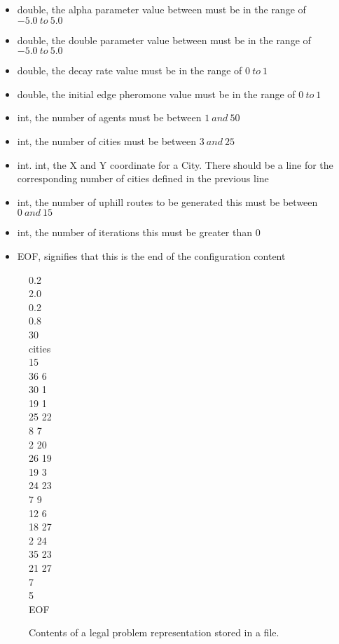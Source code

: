 \begin{itemize}
\item double, the alpha parameter value between must be in the range of $-5.0\ to\ 5.0$
\item double, the double parameter value between must be in the range of $-5.0\ to\ 5.0$
\item double, the decay rate value must be in the range of $0\ to\ 1$
\item double, the initial edge pheromone value must be in the range of $0\ to\ 1$
\item int, the number of agents must be between $1\ and\ 50$
\item int, the number of cities must be between $3\ and\ 25$
\item int. int, the X and Y coordinate for a City. There should be a line for the corresponding number of cities defined in the previous line
\item int, the number of uphill routes to be generated this must be between $0\ and\ 15$
\item int, the number of iterations this must be greater than $0$
\item EOF, signifies that this is the end of the configuration content
\end{itemize}

\begin{figure}[H]
0.2 \\
2.0 \\
0.2 \\
0.8 \\
30 \\
cities \\
15 \\
36 6 \\
30 1 \\
19 1 \\
25 22 \\
8 7 \\
2 20 \\
26 19 \\
19 3 \\
24 23 \\
7 9 \\
12 6 \\
18 27 \\
2 24 \\
35 23 \\
21 27 \\
7 \\
5 \\
EOF
\caption[Legal File Contents]{Contents of a legal problem representation stored in a file.}
\label{validConfig}
\end{figure}

